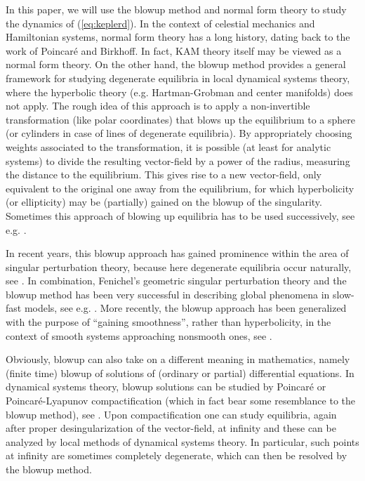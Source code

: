 \documentclass[reqno,12pt]{amsart}
\renewcommand{\eqref}[1]{(\ref{eq:#1})}
\numberwithin{equation}{section}
\begin{document}
In this paper, we will use the blowup method and normal form theory to study the dynamics of \eqref{keplerd}. In the context of celestial mechanics and Hamiltonian systems, normal form theory has a long history, dating back to the work of Poincar\'e and Birkhoff. In fact, KAM theory \cite{arnold1989a} itself may be viewed as a normal form theory. %
On the other hand, the blowup method provides a general framework for studying degenerate equilibria in local dynamical systems theory, where the hyperbolic theory (e.g. Hartman-Grobman and center manifolds) does not apply. The rough idea of this approach is to apply a non-invertible transformation (like polar coordinates) that blows up the equilibrium to a sphere (or cylinders in case of lines of degenerate equilibria). 
By appropriately choosing weights associated to the transformation, it is possible (at least for analytic systems) to divide the resulting vector-field by a power of the radius, measuring the distance to the equilibrium. This gives rise to a new vector-field, only equivalent to the original one away from the equilibrium, for which hyperbolicity (or ellipticity) may be (partially) gained on the blowup of the singularity. Sometimes this approach of blowing up equilibria has to be used successively, see e.g. \cite{dumortier2006a}. 

In recent years, this blowup approach has gained prominence within the area of singular perturbation theory, because here degenerate equilibria occur naturally, see \cite{dumortier_1991,dumortier_1993,dumortier_1996,krupa_relaxation_2001}.
In combination, Fenichel's geometric singular perturbation theory and the blowup method has been very successful in describing global phenomena in slow-fast models, see e.g. \cite{kosiuk2011a,kosiuk2015a,kristiansen2017a,2019arXiv190312232U,uldall2021a}. More recently, the blowup approach has been generalized with the purpose of ``gaining smoothness'', rather than hyperbolicity, in the context of smooth systems approaching nonsmooth ones, see \cite{jelbart2021a,jelbart2021b,kristiansen2018a,Llibre07}. 

Obviously, blowup can also take on a different meaning in mathematics, namely (finite time) blowup of solutions of (ordinary or partial) differential equations. %
In dynamical systems theory, blowup solutions can be studied by Poincar\'e or Poincar\'e-Lyapunov compactification (which in fact bear some resemblance to the blowup method), see \cite{dumortier2006a}. Upon compactification one can study equilibria, again after proper desingularization of the vector-field, at infinity and these can be analyzed by local methods of dynamical systems theory. In particular, such points at infinity are sometimes completely degenerate, which can then be resolved by the blowup method. 
\end{document}
